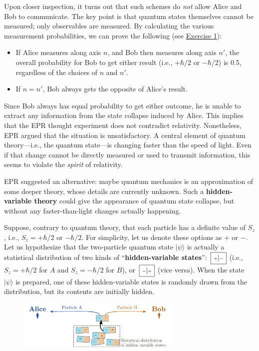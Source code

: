 \documentclass[prx,12pt]{revtex4-2}
\def\hvbox[#1]#2{\,\boxed{\scalebox{0.7}{$\,#1$}|\scalebox{0.7}{$#2\,$}}}
\begin{document}
Upon closer inspection, it turns out that such schemes do \textit{not}
allow Alice and Bob to communicate.  The key point is that quantum
states themselves cannot be measured; only observables are measured.
By calculating the various measurement probabilities, we can prove the
following (see \hyperref[ex:singletproperties]{Exercise 1}):

\begin{itemize}
\item
  If Alice measures along axis $n$, and Bob then measures along axis
  $n'$, the overall probability for Bob to get either result (i.e.,
  $+\hbar/2$ or $-\hbar/2$) is 0.5, regardless of the choices of $n$
  and $n'$.

\item If $n = n'$, Bob always gets the opposite of Alice's result.
\end{itemize}

Since Bob always has equal probability to get either outcome, he is
unable to extract any information from the state collapse induced by
Alice.  This implies that the EPR thought experiment does not
contradict relativity.  Nonetheless, EPR argued that the situation is
unsatisfactory.  A central element of quantum theory---i.e., the
quantum state---is changing faster than the speed of light.  Even if
that change cannot be directly measured or used to transmit
information, this seems to violate the \textit{spirit} of relativity.

EPR suggested an alternative: maybe quantum mechanics is an
approximation of some deeper theory, whose details are currently
unknown.  Such a \textbf{hidden-variable theory} could give the
appearance of quantum state collapse, but without any
faster-than-light changes actually happening.

Suppose, contrary to quantum theory, that each particle has a definite
value of $S_z$, i.e., $S_z = +\hbar/2$ or $-\hbar/2$.  For simplicity,
let us denote these options as $+$ or $-$.  Let us hypothesize that
the two-particle quantum state $|\psi\rangle$ is actually a
statistical distribution of two kinds of ``\textbf{hidden-variable
  states}'': $\hvbox[+]{-}$ (i.e., $S_z = +\hbar/2$ for $A$ and $S_z =
-\hbar/2$ for $B$), or $\hvbox[-]{+}$ (vice versa).  When the state
$|\psi\rangle$ is prepared, one of these hidden-variable states is
randomly drawn from the distribution, but its contents are initially
hidden.

\begin{figure}[h]
  \centering\includegraphics[width=0.7\textwidth]{hiddenvariables}
\end{figure}
\end{document}
